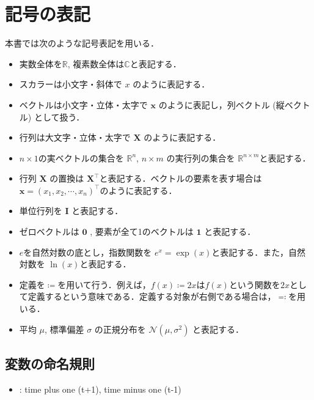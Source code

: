\section{記号の表記
}


本書では次のような記号表記を用いる．

\begin{itemize}
\item 実数全体を$\mathbb{R}$, 複素数全体は$\mathbb{C}$と表記する．

\item スカラーは小文字・斜体で $x$ のように表記する．

\item ベクトルは小文字・立体・太字で $\mathbf{x}$ のように表記し，列ベクトル (縦ベクトル) として扱う．

\item 行列は大文字・立体・太字で $\mathbf{X}$ のように表記する．

\item $n\times 1$の実ベクトルの集合を $\mathbb{R}^n$, $n\times m$ の実行列の集合を $\mathbb{R}^{n\times m}$と表記する．

\item 行列 $\mathbf{X}$ の置換は $\mathbf{X}^\top$と表記する．ベクトルの要素を表す場合は $\mathbf{x} = (x_1, x_2,\cdots, x_n)^\top$のように表記する．

\item 単位行列を $\mathbf{I}$ と表記する．

\item ゼロベクトルは $\mathbf{0}$ , 要素が全て1のベクトルは $\mathbf{1}$ と表記する．  

\item $e$を自然対数の底とし，指数関数を $e^x=\exp(x)$と表記する．また，自然対数を $\ln(x)$と表記する．

\item 定義を$\coloneqq$を用いて行う．例えば，$f(x)\coloneqq2x$は$f(x)$という関数を$2x$として定義するという意味である．定義する対象が右側である場合は，$\eqqcolon$を用いる．

\item 平均 $\mu$, 標準偏差 $\sigma$ の正規分布を $\mathcal{N}(\mu, \sigma^2)$ と表記する．

\end{itemize}


\subsection{変数の命名規則
}


\begin{itemize}
\item {} : time plus one (t+1), time minus one (t-1)
\end{itemize}
